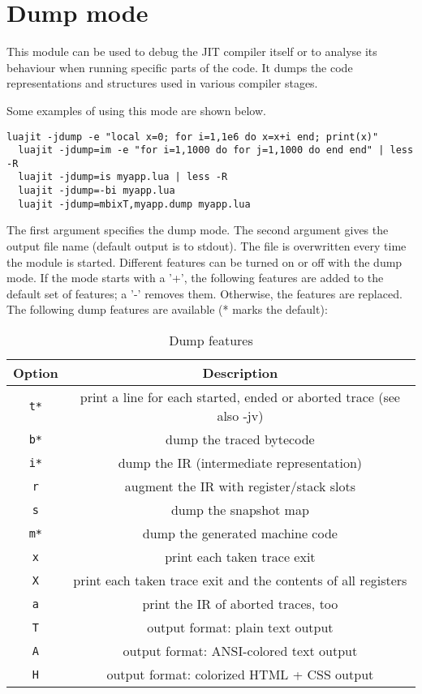 
\section{Dump mode}

This module can be used to debug the JIT compiler itself or to analyse its behaviour when running specific parts of the code. It dumps the code representations and structures used in various compiler stages.

Some examples of using this mode are shown below.
\begin{lstlisting}[style=CommandsLuaJIT]
  luajit -jdump -e "local x=0; for i=1,1e6 do x=x+i end; print(x)"
  luajit -jdump=im -e "for i=1,1000 do for j=1,1000 do end end" | less -R
  luajit -jdump=is myapp.lua | less -R
  luajit -jdump=-bi myapp.lua
  luajit -jdump=mbixT,myapp.dump myapp.lua
\end{lstlisting}
The first argument specifies the dump mode. The second argument gives the output file name (default output is to stdout). The file is overwritten every time the module is started. Different features can be turned on or off with the dump mode. If the mode starts with a '+', the following features are added to the default set of features; a '-' removes them. Otherwise, the features are replaced.
The following dump features are available (* marks the default):
\begin{table}[H]
\centering
\begin{tabular}{ |c|c| } 
  \hline
  Option & Description \\
  \hline
  \texttt{t*} & print a line for each started, ended or aborted trace (see also -jv)\\
  \texttt{b*} & dump the traced bytecode\\
  \texttt{i*} & dump the IR (intermediate representation)\\
  \texttt{r} & augment the IR with register/stack slots\\
  \texttt{s} & dump the snapshot map\\
  \texttt{m*} & dump the generated machine code\\
  \texttt{x} & print each taken trace exit\\
  \texttt{X} & print each taken trace exit and the contents of all registers\\
  \texttt{a} & print the IR of aborted traces, too\\
  \texttt{T} & output format: plain text output\\
  \texttt{A} & output format: ANSI-colored text output\\
  \texttt{H} & output format: colorized HTML + CSS output\\
  \hline
\end{tabular}
\caption{Dump features}
\end{table}

